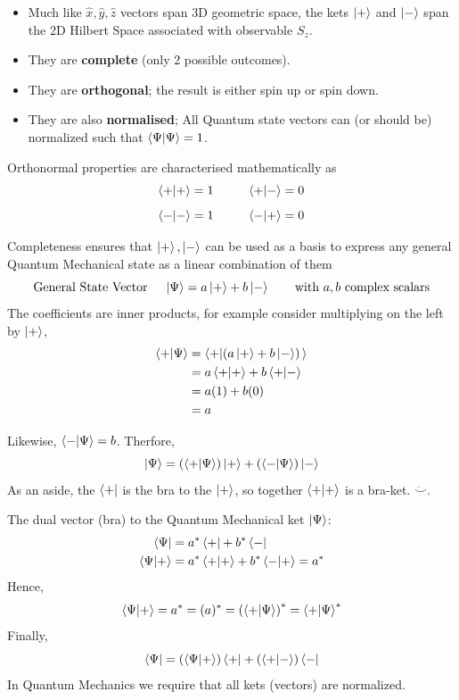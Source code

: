 \documentclass[english, 11pt]{article}
\begin{document}
         \begin{itemize}
            \item Much like $\hat{x}, \hat{y}, \hat{z}$ vectors span 3D geometric space, the kets $\left|+\right\rangle$ and $\left|-\right\rangle$ span the 2D Hilbert Space associated with observable $S_z$.
            \item They are \textbf{complete} (only 2 possible outcomes).
            \item They are \textbf{orthogonal}; the result is either spin up or spin down.
            \item They are also \textbf{normalised}; All Quantum state vectors can (or should be) normalized such that $\braket{\Psi}{\Psi} = 1$.
         \end{itemize}

         Orthonormal properties are characterised mathematically as
         \[ \braket{+}{+} = 1 \ \ \ \ \ \ \ \ \braket{+}{-} = 0 \]
         \[ \braket{-}{-} = 1 \ \ \ \ \ \ \ \ \braket{-}{+} = 0 \]

         Completeness ensures that $\left|+\right\rangle, \left|-\right\rangle$ can be used as a basis to express any general Quantum Mechanical state as a linear combination of them
         \[ \mbox{General State Vector \ \ \ } \left|\Psi\right\rangle = a\left|+\right\rangle + b\left|-\right\rangle \mbox{ \ \ \ \ \ with $a, b$ complex scalars}  \]
         The coefficients are inner products, for example consider multiplying on the left by $\left|+\right\rangle$,
         \begin{align*}
           \braket{+}{\Psi} & = \braket{+}{\left( a\ket{+}+b\ket{-} \right)} \\
                            & = a\braket{+}{+} + b\braket{+}{-} \\
                            & = a(1) + b(0) \\
                            & = a
         \end{align*}

         Likewise, $\braket{-}{\Psi} = b$. Therfore,
         \[ \ket{\Psi} = \left( \braket{+}{\Psi} \right)\ket{+} + \left( \braket{-}{\Psi} \right) \ket{-} \]
          As an aside, the $\left\langle+\right|$ is the bra to the $\left|+\right\rangle$, so together $\braket{+}{+}$ is a bra-ket. $\ddot\smile$.
          \newline

          The dual vector (bra) to the Quantum Mechanical ket $\left|\Psi\right\rangle$:
          \begin{align*}
            \bra{\Psi} & = a^*\bra{+} + b^*\bra{-} \\
            \braket{\Psi}{+} & = a^*\braket{+}{+} + b^*\braket{-}{+} = a^*
          \end{align*}
          Hence,
          \[ \braket{\Psi}{+} = a^* = (a)^* = \left( \braket{+}{\Psi} \right)^* = \braket{+}{\Psi}^* \]
          Finally,
          \[ \bra{\Psi} = \left( \braket{\Psi}{+} \right) \bra{+} + \left( \braket{+}{-} \right)\bra{-} \]
          In Quantum Mechanics we require that all kets (vectors) are normalized.
\end{document}
